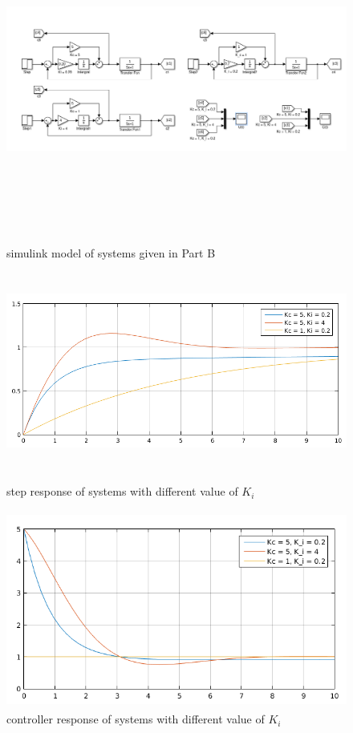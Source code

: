 \message{ !name(lab1.tex)}\documentclass[a4paper,12pt,openany]{book}
\begin{document}
 \begin{figure}[H]
   \includegraphics[width = 165mm, height = 100mm, scale = 0.95]{lab05part20.png}
   \caption{simulink model of systems given in Part B}
   \includegraphics[width = 165mm,height = 65mm, scale = 0.85]{lab05part21.png}
   \caption{step response of systems with different value of $K_i$}
  \includegraphics[width = 165mm, height = 65mm, scale = 0.85]{lab05part22.png}
  \caption{controller response of systems with different value of $K_i$}
 \end{figure}
\end{document}
